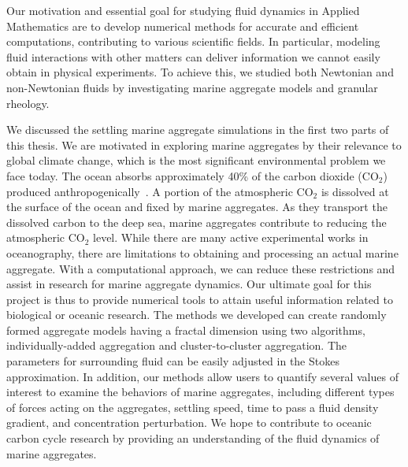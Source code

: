 
Our motivation and essential goal for studying fluid dynamics in Applied Mathematics are to develop numerical methods for accurate and efficient computations, contributing to various scientific fields. In particular, modeling fluid interactions with other matters can deliver information we cannot easily obtain in physical experiments. To achieve this, we studied both Newtonian and non-Newtonian fluids by investigating marine aggregate models and granular rheology.
\par
We discussed the settling marine aggregate simulations in the first two parts of this thesis. 
We are motivated in exploring marine aggregates by their relevance to global climate change, which is the most significant environmental problem we face today.
The ocean absorbs approximately 40\% of the carbon dioxide (CO$_2$) produced anthropogenically~\cite{omand_sinking_2020}. 
A portion of the atmospheric CO$_2$ is dissolved at the surface of the ocean and fixed by marine aggregates. As they transport the dissolved carbon to the deep sea, marine aggregates contribute to reducing the atmospheric CO$_2$ level. 
While there are many active experimental works in oceanography, there are limitations to obtaining and processing an actual marine aggregate. 
With a computational approach, we can reduce these restrictions and assist in research for marine aggregate dynamics. 
Our ultimate goal for this project is thus to provide numerical tools to attain useful information related to biological or oceanic research.
The methods we developed can create randomly formed aggregate models having a fractal dimension using two algorithms, individually-added aggregation and cluster-to-cluster aggregation. The parameters for surrounding fluid can be easily adjusted in the Stokes approximation. 
In addition, our methods allow users to quantify several values of interest to examine the behaviors of marine aggregates, including different types of forces acting on the aggregates, settling speed, time to pass a fluid density gradient, and concentration perturbation.
We hope to contribute to oceanic carbon cycle research by providing an understanding of the fluid dynamics of marine aggregates. 


